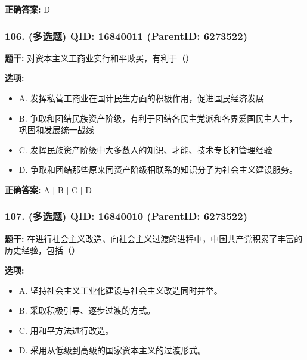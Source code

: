 \documentclass[12pt,UTF8]{ctexart}
\begin{document}
\textbf{正确答案:}
D

\vspace{0.3em}\hrulefill\vspace{0.7em}

\subsubsection*{106. (多选题) \small QID: 16840011 (ParentID: 6273522)}

\textbf{题干:}
对资本主义工商业实行和平赎买，有利于（）



\textbf{选项:}
\begin{itemize}[leftmargin=*]

  \item A. 发挥私营工商业在国计民生方面的积极作用，促进国民经济发展

  \item B. 争取和团结民族资产阶级，有利于团结各民主党派和各界爱国民主人士，巩固和发展统一战线

  \item C. 发挥民族资产阶级中大多数人的知识、才能、技术专长和管理经验

  \item D. 争取和团结那些原来同资产阶级相联系的知识分子为社会主义建设服务。

\end{itemize}

\textbf{正确答案:}
A | B | C | D

\vspace{0.3em}\hrulefill\vspace{0.7em}

\subsubsection*{107. (多选题) \small QID: 16840010 (ParentID: 6273522)}

\textbf{题干:}
在进行社会主义改造、向社会主义过渡的进程中，中国共产党积累了丰富的历史经验，包括（）



\textbf{选项:}
\begin{itemize}[leftmargin=*]

  \item A. 坚持社会主义工业化建设与社会主义改造同时并举。

  \item B. 采取积极引导、逐步过渡的方式。

  \item C. 用和平方法进行改造。

  \item D. 采用从低级到高级的国家资本主义的过渡形式。

\end{itemize}
\end{document}
